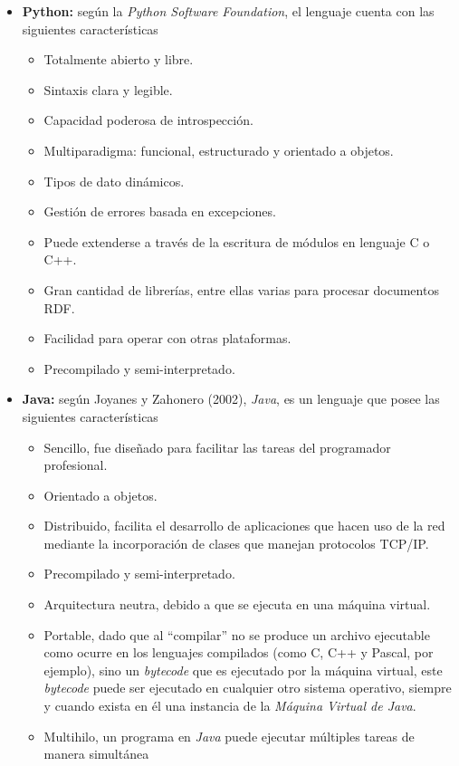 \begin{itemize}
\item \textbf{Python:} según la \textit{Python Software Foundation}, el lenguaje cuenta con las siguientes características
    \begin{itemize}
    \item Totalmente abierto y libre.
    \item Sintaxis clara y legible.
    \item Capacidad poderosa de introspección.
    \item Multiparadigma: funcional, estructurado y orientado a objetos.
    \item Tipos de dato dinámicos.
    \item Gestión de errores basada en excepciones.
    \item Puede extenderse a través de la escritura de módulos en lenguaje C o C++.
    \item Gran cantidad de librerías, entre ellas varias para procesar documentos RDF.
    \item Facilidad para operar con otras plataformas.
    \item Precompilado y semi-interpretado.
    \end{itemize}

\item \textbf{Java:} según Joyanes y Zahonero (2002), \textit{Java}, es un lenguaje que posee las siguientes características
    \begin{itemize}
    \item Sencillo, fue diseñado para facilitar las tareas del programador profesional.
    \item Orientado a objetos.
    \item Distribuido, facilita el desarrollo de aplicaciones que hacen uso de la red mediante la incorporación de clases que manejan protocolos TCP/IP.
    \item Precompilado y semi-interpretado.
    \item Arquitectura neutra, debido a que se ejecuta en una máquina virtual.
    \item Portable, dado que al ``compilar'' no se produce un archivo ejecutable como ocurre en los lenguajes compilados (como C, C++ y Pascal, por ejemplo), sino un \textit{bytecode} que es ejecutado por la máquina virtual, este \textit{bytecode} puede ser ejecutado en cualquier otro sistema operativo, siempre y cuando exista en él una instancia de la \textit{Máquina Virtual de Java}.
    \item Multihilo, un programa en \textit{Java} puede ejecutar múltiples tareas de manera simultánea
    \end{itemize}
\end{itemize}

